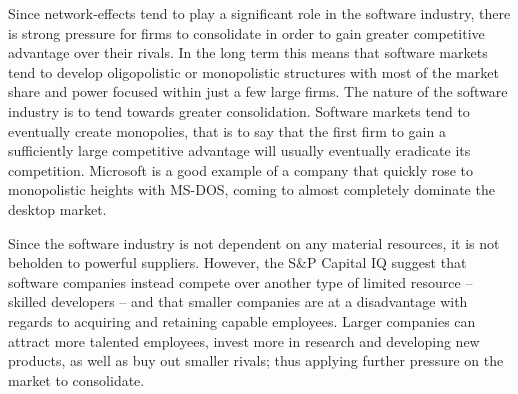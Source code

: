 Since network-effects tend to play a significant role in the software industry, there is strong pressure for firms to consolidate in order to gain greater competitive advantage over their rivals.\autocite[422]{schief2013mergers}
In the long term this means that software markets tend to develop oligopolistic or monopolistic structures with most of the market share and power focused within just a few large firms.\autocite[422]{schief2013mergers}
The nature of the software industry is to tend towards greater consolidation.\autocite[]{LargeParadigmShiftCloudComputing}
Software markets tend to eventually create monopolies, that is to say that the first firm to gain a sufficiently large competitive advantage will usually eventually eradicate its competition.\autocite[4]{buxmann2012software}
Microsoft is a good example of a company that quickly rose to monopolistic heights with MS-DOS, coming to almost completely dominate the desktop market.\autocite[4]{buxmann2012software}

Since the software industry is not dependent on any material resources, it is not beholden to powerful suppliers.
However, the S\&P Capital IQ suggest that software companies instead compete over another type of limited resource -- skilled developers -- and that smaller companies are at a disadvantage with regards to acquiring and retaining capable employees.\autocite[39]{SurveysSoftware2015}
Larger companies can attract more talented employees, invest more in research and developing new products, as well as buy out smaller rivals; thus applying further pressure on the market to consolidate.\autocite[34]{IndustrySurveysInternet}

